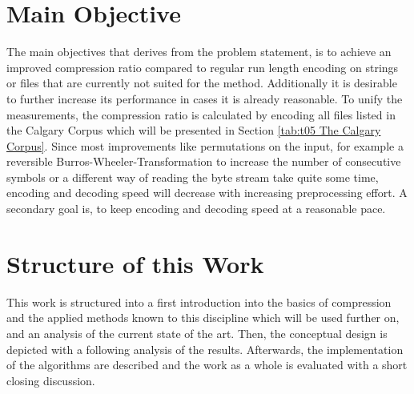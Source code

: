 \section{Main Objective}
\label{ch:Introduction:sec:Main Objective}
\par{
The main objectives that derives from the problem statement, is to achieve an improved compression ratio compared to regular run length encoding on strings or files that are currently not suited for the method. Additionally it is desirable to further increase its performance in cases it is already reasonable. To unify the measurements, the compression ratio is calculated by encoding all files listed in the Calgary Corpus which will be presented in Section \ref{tab:t05 The Calgary Corpus}. Since most improvements like permutations on the input, for example a reversible Burros-Wheeler-Transformation to increase the number of consecutive symbols or a different way of reading the byte stream take quite some time, encoding and decoding speed will decrease with increasing preprocessing effort. A secondary goal is, to keep encoding and decoding speed at a reasonable pace.
}
\section{Structure of this Work}
\label{ch:Intoduction:sec:Structure}
\par{
This work is structured into a first introduction into the basics of compression and the applied methods known to this discipline which will be used further on, and an analysis of the current state of the art. Then, the conceptual design is depicted with a following analysis of the results. Afterwards, the implementation of the algorithms are described and the work as a whole is evaluated with a short closing discussion.  
}
